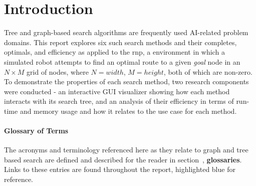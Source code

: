 \section{Introduction} %
\label{sec:introduction}
Tree and graph-based search algorithms are frequently used AI-related problem domains. This report explores six such search methods and their \glspl{complete}, \glspl{optimal}, and efficiency as applied to the \acrlong{rnp}, a \Gls{environment} in which a simulated robot attempts to find an optimal route to a given \textit{goal} \gls{node} in an $N \times M$ grid of nodes, where $N=width$, $M=height$, both of which are non-zero. To demonstrate the properties of each search method, two research components were conducted - an interactive GUI visualizer showing how each method interacts with its search tree, and an analysis of their efficiency in terms of run-time and memory usage and how it relates to the use case for each method.

\paragraph{Glossary of Terms} %
\label{par:glossary_of_terms}
The acronyms and terminology referenced here as they relate to graph and tree based search are defined and described for the reader in section~\pageref{glossaries}, \textbf{glossaries}. Links to these entries are found throughout the report, highlighted blue for reference.
